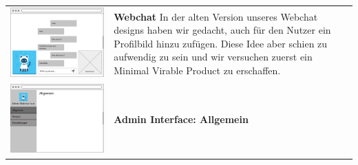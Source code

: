 \begin{tabular}{C{6cm}  L{7cm}}
    \includegraphics[width=\linewidth]{bilder/old vers. UI Design/WebChat.png}                   & \textbf{Webchat} \newline
    In der alten Version unseres Webchat designs haben wir gedacht, auch für den
    Nutzer ein Profilbild hinzu zufügen. Diese Idee aber schien zu aufwendig zu sein und wir versuchen
    zuerst ein Minimal Virable Product zu erschaffen.                                                                                           \\
    \includegraphics[width=\linewidth]{bilder/old vers. UI Design/Admin Interface Allgemein.png} & \textbf{Admin Interface: Allgemein} \newline

\end{tabular}
